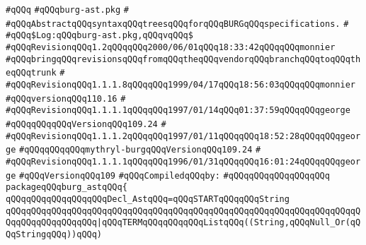 \label{src/app/burg/burg-ast.pkg}
\verb|#qQQq|\newline
\verb|#qQQqburg-ast.pkg|\newline
\verb|#|\newline
\verb|#qQQqAbstractqQQqsyntaxqQQqtreesqQQqforqQQqBURGqQQqspecifications.|\newline
\verb|#|\newline
\verb|#qQQq$Log:qQQqburg-ast.pkg,qQQqvqQQq$|\newline
\verb|#qQQqRevisionqQQq1.2qQQqqQQq2000/06/01qQQq18:33:42qQQqqQQqmonnier|\newline
\verb|#qQQqbringqQQqrevisionsqQQqfromqQQqtheqQQqvendorqQQqbranchqQQqtoqQQqtheqQQqtrunk|\newline
\verb|#|\newline
\verb|#qQQqRevisionqQQq1.1.1.8qQQqqQQq1999/04/17qQQq18:56:03qQQqqQQqmonnier|\newline
\verb|#qQQqversionqQQq110.16|\newline
\verb|#|\newline
\verb|#qQQqRevisionqQQq1.1.1.1qQQqqQQq1997/01/14qQQq01:37:59qQQqqQQqgeorge|\newline
\verb|#qQQqqQQqqQQqVersionqQQq109.24|\newline
\verb|#|\newline
\verb|#qQQqRevisionqQQq1.1.1.2qQQqqQQq1997/01/11qQQqqQQq18:52:28qQQqqQQqgeorge|\newline
\verb|#qQQqqQQqqQQqmythryl-burgqQQqVersionqQQq109.24|\newline
\verb|#|\newline
\verb|#qQQqRevisionqQQq1.1.1.1qQQqqQQq1996/01/31qQQqqQQq16:01:24qQQqqQQqgeorge|\newline
\verb|#qQQqVersionqQQq109|\newline
\newline
\verb|#qQQqCompiledqQQqby:|\newline
\verb|#qQQqqQQqqQQqqQQqqQQq|\newline
\newline
\newline
\newline
\verb|packageqQQqburg_astqQQq{|\newline
\newline
\newline
\verb|qQQqqQQqqQQqqQQqqQQqDecl_AstqQQq=qQQqSTARTqQQqqQQqString|\newline
\verb|qQQqqQQqqQQqqQQqqQQqqQQqqQQqqQQqqQQqqQQqqQQqqQQqqQQqqQQqqQQqqQQqqQQqqQQqqQQqqQQqqQQqqQQq|\verb#|qQQqTERMqQQqqQQqqQQqListqQQq((String,qQQqNull_Or(qQQqStringqQQq))qQQq)#\newline
